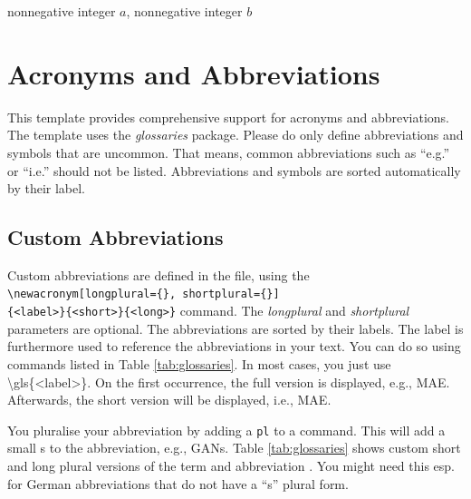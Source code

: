 \begin{algorithm}[htb]
	\begin{algorithmic}
		\Require nonnegative integer $a$, nonnegative integer $b$
		 
		\Else 
		\EndIf
		\EndFunction
	\end{algorithmic}
	\caption{Euclid's GCD algorithm in pseudocode}
	\label{alg:garbage}
\end{algorithm}

\section{Acronyms and Abbreviations}
This template provides comprehensive support for acronyms and abbreviations. The template uses the \textit{glossaries} package. 
Please do only define abbreviations and symbols that are uncommon. That means, common abbreviations such as \enquote{e.g.} or \enquote{i.e.} should not be listed. Abbreviations and symbols are sorted automatically by their label. 

\subsection{Custom Abbreviations}
Custom abbreviations are defined in the  file, using the \\
\texttt{\textbackslash newacronym[longplural=\{<long plural>\}, shortplural=\{<short plural>\}]\\ \{<label>\}\{<short>\}\{<long>\}} command. The \textit{longplural} and \textit{shortplural} parameters are optional. The abbreviations are sorted by their labels. The label is furthermore used to reference the abbreviations in your text. You can do so using commands listed in Table \ref{tab:glossaries}. In most cases, you just use \textbackslash gls\{<label>\}. On the first occurrence, the full version is displayed, e.g., \gls{MAE}. Afterwards, the short version will be displayed, i.e., \gls{MAE}.

You pluralise your abbreviation by adding a \texttt{pl} to a command. This will add a small s to the abbreviation, e.g., \glspl{GAN}. Table \ref{tab:glossaries} shows custom short and long plural versions of the term and abbreviation . You might need this esp. for German abbreviations that do not have a \enquote{s} plural form.

